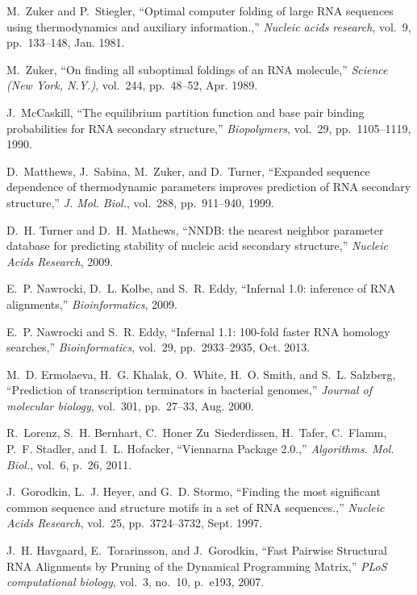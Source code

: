 \documentclass[11pt, oneside]{Thesis} %
\begin{document}
\begin{thebibliography}{100}
M.~Zuker and P.~Stiegler, ``{Optimal computer folding of large RNA sequences
  using thermodynamics and auxiliary information.},'' {\em Nucleic acids
  research}, vol.~9, pp.~133--148, Jan. 1981.

M.~Zuker, ``{On finding all suboptimal foldings of an RNA molecule},'' {\em
  Science (New York, N.Y.)}, vol.~244, pp.~48--52, Apr. 1989.

J.~McCaskill, ``The equilibrium partition function and base pair binding
  probabilities for {RNA} secondary structure,'' {\em Biopolymers}, vol.~29,
  pp.~1105--1119, 1990.

D.~Matthews, J.~Sabina, M.~Zuker, and D.~Turner, ``Expanded sequence dependence
  of thermodynamic parameters improves prediction of {RNA} secondary
  structure,'' {\em J. Mol. Biol.}, vol.~288, pp.~911--940, 1999.

D.~H. Turner and D.~H. Mathews, ``{NNDB: the nearest neighbor parameter
  database for predicting stability of nucleic acid secondary structure},''
  {\em Nucleic Acids Research}, 2009.

E.~P. Nawrocki, D.~L. Kolbe, and S.~R. Eddy, ``{Infernal 1.0: inference of
  {R}{N}{A} alignments},'' {\em Bioinformatics}, 2009.

E.~P. Nawrocki and S.~R. Eddy, ``{Infernal 1.1: 100-fold faster RNA homology
  searches},'' {\em Bioinformatics}, vol.~29, pp.~2933--2935, Oct. 2013.

M.~D. Ermolaeva, H.~G. Khalak, O.~White, H.~O. Smith, and S.~L. Salzberg,
  ``{Prediction of transcription terminators in bacterial genomes},'' {\em
  Journal of molecular biology}, vol.~301, pp.~27--33, Aug. 2000.

R.~Lorenz, S.~H. Bernhart, C.~Honer Zu~Siederdissen, H.~Tafer, C.~Flamm, P.~F.
  Stadler, and I.~L. Hofacker, ``Viennarna {Package} 2.0.,'' {\em Algorithms.
  Mol. Biol.}, vol.~6, p.~26, 2011.

J.~Gorodkin, L.~J. Heyer, and G.~D. Stormo, ``{Finding the most significant
  common sequence and structure motifs in a set of RNA sequences.},'' {\em
  Nucleic Acids Research}, vol.~25, pp.~3724--3732, Sept. 1997.

J.~H. Havgaard, E.~Torarinsson, and J.~Gorodkin, ``{Fast Pairwise Structural
  RNA Alignments by Pruning of the Dynamical Programming Matrix},'' {\em PLoS
  computational biology}, vol.~3, no.~10, p.~e193, 2007.


\end{thebibliography}
\end{document}
